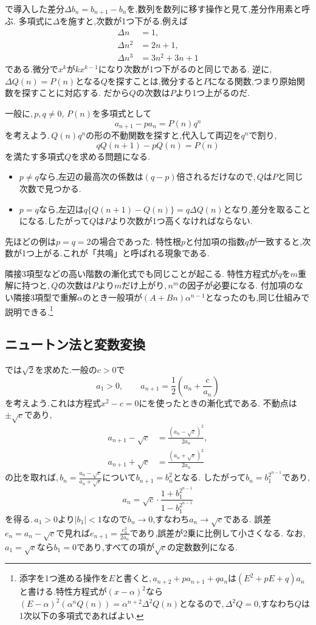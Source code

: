 で導入した差分$\Delta b_n=b_{n+1}-b_n$を,数列を数列に移す操作と見て,差分作用素と呼ぶ.
多項式に$\Delta$を施すと,次数が1つ下がる.例えば
\begin{align*}
  \Delta n&=1,\\
  \Delta n^2&=2n+1,\\
  \Delta n^3&=3n^2+3n+1
\end{align*}
である.微分で$x^k$が$kx^{k-1}$になり次数が1つ下がるのと同じである.
逆に,\,$\Delta Q(n)=P(n)$となる$Q$を探すことは,微分すると$P$になる関数,つまり原始関数を探すことに対応する.
だから$Q$の次数は$P$より1つ上がるのだ.

一般に,\,$p,q\ne0$, $P(n)$を多項式として
\[
  a_{n+1}-pa_n=P(n)q^n
\]
を考えよう.\,$Q(n)q^n$の形の不動関数を探すと,代入して両辺を$q^n$で割り,
\[
  qQ(n+1)-pQ(n)=P(n)
\]
を満たす多項式$Q$を求める問題になる.
\begin{itemize}
  \item $p\ne q$なら,左辺の最高次の係数は$(q-p)$倍されるだけなので,\,$Q$は$P$と同じ次数で見つかる.
  \item $p=q$なら,左辺は$q\{Q(n+1)-Q(n)\}=q\Delta Q(n)$となり,差分を取ることになる.したがって$Q$は$P$より次数が1つ高くなければならない.
\end{itemize}
先ほどの例は$p=q=2$の場合であった.
特性根$p$と付加項の指数$q$が一致すると,次数が1つ上がる.これが「共鳴」と呼ばれる現象である.

隣接3項型などの高い階数の漸化式でも同じことが起こる.
特性方程式が$q$を$m$重解に持つと,\,$Q$の次数は$P$より$m$だけ上がり,\,$n^m$の因子が必要になる.
付加項のない隣接3項型で重解$\alpha$のとき一般項が$(A+Bn)\alpha^{n-1}$となったのも,同じ仕組みで説明できる.\footnote{添字を1つ進める操作を$E$と書くと,\,$a_{n+2}+pa_{n+1}+qa_n$は$(E^2+pE+q)a_n$と書ける.特性方程式が$(x-\alpha)^2$なら$(E-\alpha)^2(\alpha^nQ(n))=\alpha^{n+2}\Delta^2Q(n)$となるので,\,$\Delta^2Q=0$,すなわち$Q$は1次以下の多項式であればよい.}

\subsection{ニュートン法と変数変換}\label{節：ニュートン法と変数変換}

では$\sqrt2$を求めた.一般の$c>0$で
\[
  a_1>0,\qquad a_{n+1}=\frac12\left(a_n+\frac{c}{a_n}\right)
\]
を考えよう.これは方程式$x^2-c=0$にを使ったときの漸化式である.
不動点は$\pm\sqrt c$であり,
\begin{align*}
  a_{n+1}-\sqrt c&=\frac{(a_n-\sqrt c)^2}{2a_n},\\
  a_{n+1}+\sqrt c&=\frac{(a_n+\sqrt c)^2}{2a_n}
\end{align*}
の比を取れば,\,$b_n=\frac{a_n-\sqrt c}{a_n+\sqrt c}$について$b_{n+1}=b_n^2$となる.
したがって$b_n=b_1^{2^{n-1}}$であり,
\[
  a_n=\sqrt c\cdot\frac{1+b_1^{2^{n-1}}}{1-b_1^{2^{n-1}}}
\]
を得る.\,$a_1>0$より$|b_1|<1$なので$b_n\to0$,すなわち$a_n\to\sqrt c$である.
誤差$e_n=a_n-\sqrt c$で見れば$e_{n+1}=\frac{e_n^2}{2a_n}$であり,誤差が2乗に比例して小さくなる.
なお,\,$a_1=\sqrt c$なら$b_1=0$であり,すべての項が$\sqrt c$の定数数列になる.

